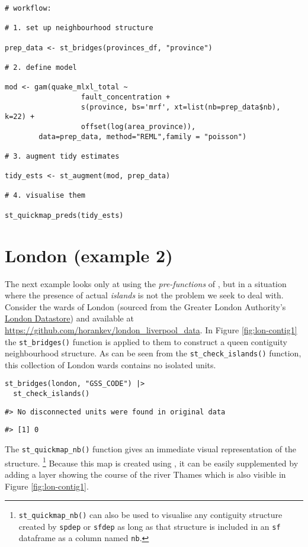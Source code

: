 \begin{verbatim}
# workflow:

# 1. set up neighbourhood structure

prep_data <- st_bridges(provinces_df, "province")

# 2. define model

mod <- gam(quake_mlxl_total ~ 
                  fault_concentration +
                  s(province, bs='mrf', xt=list(nb=prep_data$nb), k=22) +
                  offset(log(area_province)),
        data=prep_data, method="REML",family = "poisson")

# 3. augment tidy estimates

tidy_ests <- st_augment(mod, prep_data)

# 4. visualise them

st_quickmap_preds(tidy_ests)
\end{verbatim}

\section{London (example 2)}\label{london-example-2}

The next example looks only at using the \emph{pre-functions} of , but in a situation where the presence of actual \emph{islands} is not the problem we seek to deal with. Consider the wards of London (sourced from the Greater London Authority's \href{https://data.london.gov.uk/}{London Datastore}) and available at
\url{https://github.com/horankev/london_liverpool_data}. In Figure \ref{fig:lon-contig1} the \texttt{st\_bridges()}
function is applied to them to construct a queen contiguity
neighbourhood structure. As can be seen from the \texttt{st\_check\_islands()} function, this collection of London wards contains no isolated units.

\begin{verbatim}
st_bridges(london, "GSS_CODE") |> 
  st_check_islands()
\end{verbatim}

\begin{verbatim}
#> No disconnected units were found in original data
\end{verbatim}

\begin{verbatim}
#> [1] 0
\end{verbatim}

The \texttt{st\_quickmap\_nb()} function gives an immediate visual representation of the structure. \footnote{\texttt{st\_quickmap\_nb()} can also be used to visualise any contiguity structure created by \texttt{spdep} or \texttt{sfdep} as long as that structure is included in an \texttt{sf} dataframe as a column named \texttt{nb}.} Because this map is created using , it can be easily supplemented by adding a layer showing the course of the river Thames which is also visible in Figure \ref{fig:lon-contig1}.


